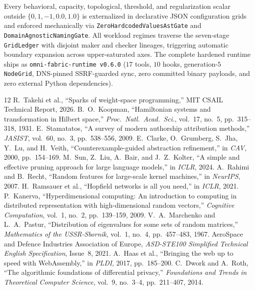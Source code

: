 \documentclass[11pt,a4paper]{article}
\begin{document}
Every behavioral, capacity, topological, threshold, and regularization scalar outside $\{0, 1, -1, 0.0, 1.0\}$ is externalized in declarative JSON configuration grids and enforced mechanically via \texttt{ZeroHardcodedValuesAstGate} and \texttt{DomainAgnosticNamingGate}. All workload regimes traverse the seven-stage \texttt{GridLedger} with disjoint maker and checker lineages, triggering automatic boundary expansion across upper-saturated axes. The complete hardened runtime ships as \texttt{omni-fabric-runtime v0.6.0} ($17$ tools, $10$ hooks, generation-$5$ \texttt{NodeGrid}, DNS-pinned SSRF-guarded sync, zero committed binary payloads, and zero external Python dependencies).

\begin{thebibliography}{12}
 R.~Takehi et al., ``Sparks of weight-space programming,'' MIT CSAIL Technical Report, 2026.
 B.~O.~Koopman, ``Hamiltonian systems and transformation in Hilbert space,'' \emph{Proc.\ Natl.\ Acad.\ Sci.}, vol.~17, no.~5, pp.~315--318, 1931.
 E.~Stamatatos, ``A survey of modern authorship attribution methods,'' \emph{JASIST}, vol.~60, no.~3, pp.~538--556, 2009.
 E.~Clarke, O.~Grumberg, S.~Jha, Y.~Lu, and H.~Veith, ``Counterexample-guided abstraction refinement,'' in \emph{CAV}, 2000, pp.~154--169.
 M.~Sun, Z.~Liu, A.~Bair, and J.~Z.~Kolter, ``A simple and effective pruning approach for large language models,'' in \emph{ICLR}, 2024.
 A.~Rahimi and B.~Recht, ``Random features for large-scale kernel machines,'' in \emph{NeurIPS}, 2007.
 H.~Ramsauer et al., ``Hopfield networks is all you need,'' in \emph{ICLR}, 2021.
 P.~Kanerva, ``Hyperdimensional computing: An introduction to computing in distributed representation with high-dimensional random vectors,'' \emph{Cognitive Computation}, vol.~1, no.~2, pp.~139--159, 2009.
 V.~A.~Marchenko and L.~A.~Pastur, ``Distribution of eigenvalues for some sets of random matrices,'' \emph{Mathematics of the USSR-Sbornik}, vol.~1, no.~4, pp.~457--483, 1967.
 AeroSpace and Defence Industries Association of Europe, \emph{ASD-STE100 Simplified Technical English Specification}, Issue~8, 2021.
 A.~Haas et al., ``Bringing the web up to speed with WebAssembly,'' in \emph{PLDI}, 2017, pp.~185--200.
 C.~Dwork and A.~Roth, ``The algorithmic foundations of differential privacy,'' \emph{Foundations and Trends in Theoretical Computer Science}, vol.~9, no.~3--4, pp.~211--407, 2014.
\end{thebibliography}
\end{document}
